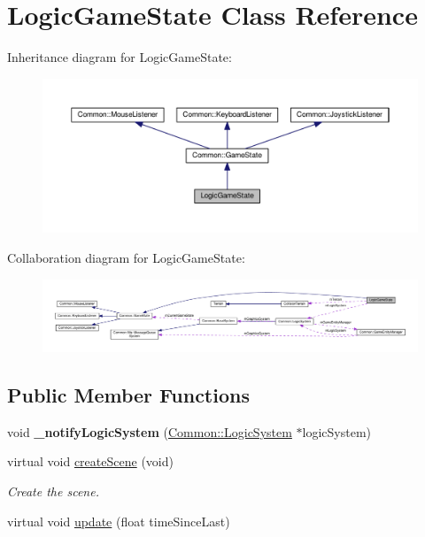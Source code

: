 \hypertarget{class_logic_game_state}{}\section{Logic\+Game\+State Class Reference}
\label{class_logic_game_state}


Inheritance diagram for Logic\+Game\+State\+:\nopagebreak
\begin{figure}[H]
\begin{center}
\leavevmode
\includegraphics[width=350pt]{class_logic_game_state__inherit__graph}
\end{center}
\end{figure}


Collaboration diagram for Logic\+Game\+State\+:\nopagebreak
\begin{figure}[H]
\begin{center}
\leavevmode
\includegraphics[width=350pt]{class_logic_game_state__coll__graph}
\end{center}
\end{figure}
\subsection*{Public Member Functions}
\begin{DoxyCompactItemize}
\item 
\mbox{\label{class_logic_game_state_a769594b36e5668497b9ef0b37dcb4b9b}} 
void {\bfseries \+\_\+notify\+Logic\+System} (\hyperlink{class_common_1_1_logic_system}{Common\+::\+Logic\+System} $\ast$logic\+System)
\item 
\mbox{\label{class_logic_game_state_a8ac73ebad7575ebdb5e36fdd59799332}} 
virtual void \hyperlink{class_logic_game_state_a8ac73ebad7575ebdb5e36fdd59799332}{create\+Scene} (void)
\begin{DoxyCompactList}\small\item\em Create the scene. \end{DoxyCompactList}\item 
virtual void \hyperlink{class_logic_game_state_a144a2deb659d903956bd955d86c4d6b7}{update} (float time\+Since\+Last)
\end{DoxyCompactItemize}
